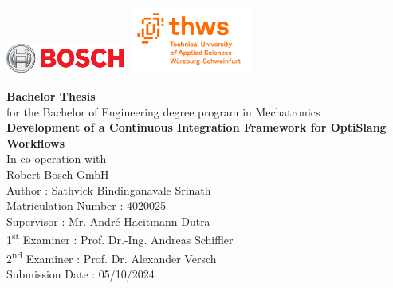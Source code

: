 \begin{titlepage}
    \par
    \includegraphics[width=0.3\textwidth, valign=M]{Logo/bosch_logo.png}
    \hfill
    \includegraphics[width=0.3\textwidth,valign=M]{Logo/Thws-logo_English.png}
    \par
    \vspace{3cm}
    \begin{center}
         \textbf{\Huge Bachelor Thesis}
         \vspace{5pt}
         \\
         for the Bachelor of Engineering degree program in Mechatronics
         \vspace{2.5cm}
         \\
         \textbf{\Huge Development of a Continuous Integration Framework for OptiSlang Workflows}
         \vspace{2cm}
         \\
         In co-operation with
         \vspace{5pt}
         \\
         Robert Bosch GmbH
         \vspace{2cm}
         \\
         Author : Sathvick Bindinganavale Srinath\\
         Matriculation Number : 4020025
         \vspace{1cm}\\
         Supervisor : Mr. André Haeitmann Dutra \\
         1\textsuperscript{st} Examiner : Prof. Dr.-Ing. Andreas Schiffler\\
         2\textsuperscript{nd} Examiner : Prof. Dr. Alexander Versch
         \vspace{1cm} \\
         Submission Date : 05/10/2024
    \end{center}
\end{titlepage}